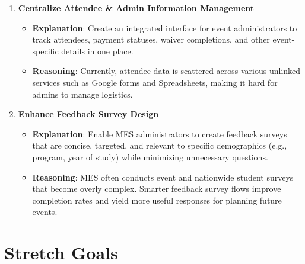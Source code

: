 \documentclass{article}
\begin{document}
\begin{enumerate}
    \item \textbf{Centralize Attendee \& Admin Information Management}
    \begin{itemize}
        \item \textbf{Explanation}: Create an integrated interface for event administrators to track attendees, payment statuses, waiver completions, and other event-specific details in one place.
        \item \textbf{Reasoning}: Currently, attendee data is scattered across various unlinked services such as Google forms and Spreadsheets, making it hard for admins to manage logistics.
    \end{itemize}

    \item \textbf{Enhance Feedback Survey Design}
    \begin{itemize}
        \item \textbf{Explanation}: Enable MES administrators to create feedback surveys that are concise, targeted, and relevant to specific demographics (e.g., program, year of study) while minimizing unnecessary questions.
        \item \textbf{Reasoning}: MES often conducts event and nationwide student surveys that become overly complex. Smarter feedback survey flows improve completion rates and yield more useful responses for planning future events.
    \end{itemize}

\end{enumerate}

\section{Stretch Goals}
\end{document}
